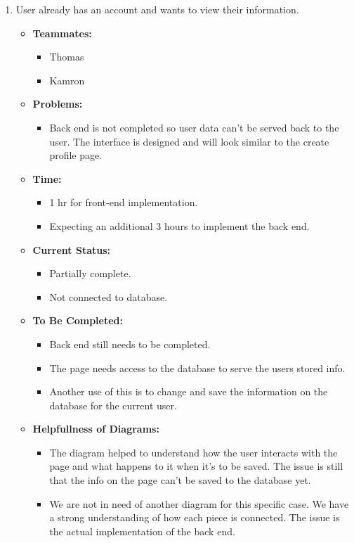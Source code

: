 \documentclass[12pt]{article}
\begin{document}
\begin{enumerate}
\begin{enumerate}
\begin{enumerate}
\begin{enumerate}
  \begin{enumerate}
    \item User already has an account and wants to view their information.
      \begin{itemize}
        \item \textbf{Teammates:}
          \begin{itemize}
            \item Thomas
            \item Kamron
          \end{itemize}
        \item \textbf{Problems:}
          \begin{itemize}
            \item Back end is not completed so user data can’t be served back to the user. The interface is designed and will look similar to the create profile page.
          \end{itemize}
        \item \textbf{Time:}
          \begin{itemize}
            \item 1 hr for front-end implementation.
            \item Expecting an additional 3 hours to implement the back end.
          \end{itemize}
        \item \textbf{Current Status:}
          \begin{itemize}
            \item Partially complete.
            \item Not connected to database.
          \end{itemize}
        \item \textbf{To Be Completed:}
          \begin{itemize}
            \item Back end still needs to be completed.
            \item The page needs access to the database to serve the users stored info.
            \item Another use of this is to change and save the information on the database for the current user.
          \end{itemize}
        \item \textbf{Helpfullness of Diagrams:}
          \begin{itemize}
            \item The diagram helped to understand how the user interacts with the page and what happens to it when it’s to be saved. The issue is still that the info on the page can’t be saved to the database yet.
            \item We are not in need of another diagram for this specific case. We have a strong understanding of how each piece is connected. The issue is the actual implementation of the back end.
          \end{itemize}
      \end{itemize}
  \end{enumerate}


\end{enumerate}
\end{enumerate}
\end{enumerate}
\end{enumerate}
\end{document}
